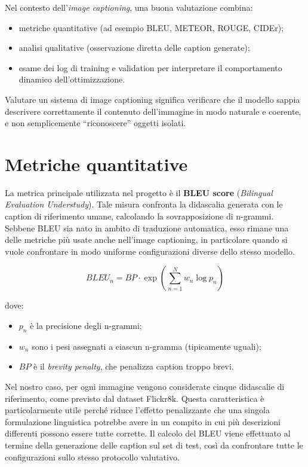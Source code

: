 \documentclass[11pt,a4paper]{report}
\begin{document}
Nel contesto dell’\emph{image captioning}, una buona valutazione combina:
\begin{itemize}
  \item metriche quantitative (ad esempio BLEU, METEOR, ROUGE, CIDEr);
  \item analisi qualitative (osservazione diretta delle caption generate);
  \item esame dei log di training e validation per interpretare il comportamento dinamico dell’ottimizzazione.
\end{itemize}

\begin{tcolorbox}[title=Obiettivo della valutazione]
Valutare un sistema di image captioning significa verificare che il modello sappia descrivere correttamente il contenuto dell’immagine in modo naturale e coerente, e non semplicemente “riconoscere” oggetti isolati.
\end{tcolorbox}

\section{Metriche quantitative}

La metrica principale utilizzata nel progetto è il \textbf{BLEU score} (\emph{Bilingual Evaluation Understudy}). Tale misura confronta la didascalia generata con le caption di riferimento umane, calcolando la sovrapposizione di n-grammi. Sebbene BLEU sia nato in ambito di traduzione automatica, esso rimane una delle metriche più usate anche nell’image captioning, in particolare quando si vuole confrontare in modo uniforme configurazioni diverse dello stesso modello.

\[
BLEU_n = BP \cdot \exp \left( \sum_{n=1}^{N} w_n \log p_n \right)
\]

dove:
\begin{itemize}
  \item $p_n$ è la precisione degli n-grammi;
  \item $w_n$ sono i pesi assegnati a ciascun n-gramma (tipicamente uguali);
  \item $BP$ è il \emph{brevity penalty}, che penalizza caption troppo brevi.
\end{itemize}

Nel nostro caso, per ogni immagine vengono considerate cinque didascalie di riferimento, come previsto dal dataset Flickr8k. Questa caratteristica è particolarmente utile perché riduce l’effetto penalizzante che una singola formulazione linguistica potrebbe avere in un compito in cui più descrizioni differenti possono essere tutte corrette. Il calcolo del BLEU viene effettuato al termine della generazione delle caption sul set di test, così da confrontare tutte le configurazioni sullo stesso protocollo valutativo.
\end{document}

